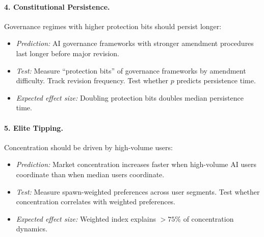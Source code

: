 \documentclass[12pt]{article}
\begin{document}
\paragraph{4. Constitutional Persistence.} Governance regimes with higher protection bits should persist longer:
\begin{itemize}
    \item \textit{Prediction:} AI governance frameworks with stronger amendment procedures last longer before major revision.
    \item \textit{Test:} Measure ``protection bits'' of governance frameworks by amendment difficulty. Track revision frequency. Test whether $p$ predicts persistence time.
    \item \textit{Expected effect size:} Doubling protection bits doubles median persistence time.
\end{itemize}

\paragraph{5. Elite Tipping.} Concentration should be driven by high-volume users:
\begin{itemize}
    \item \textit{Prediction:} Market concentration increases faster when high-volume AI users coordinate than when median users coordinate.
    \item \textit{Test:} Measure spawn-weighted preferences across user segments. Test whether concentration correlates with weighted preferences.
    \item \textit{Expected effect size:} Weighted index explains $>75\%$ of concentration dynamics.
\end{itemize}
\end{document}
